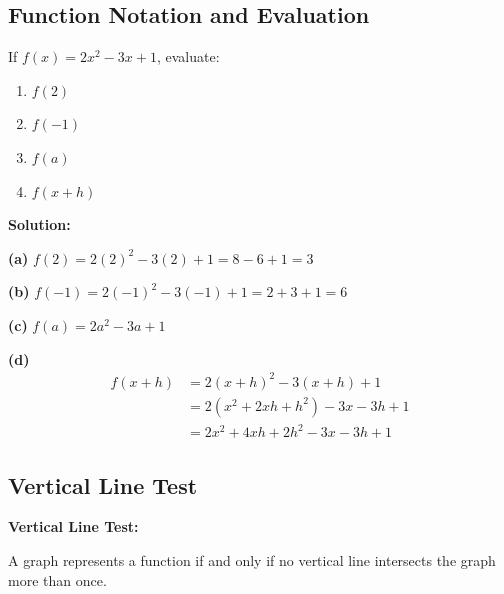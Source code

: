 \documentclass[12pt,a4paper]{article}
\begin{document}
\subsection{Function Notation and Evaluation}

\begin{example}
If $f(x) = 2x^2 - 3x + 1$, evaluate:
\begin{enumerate}[label=(\alph*)]
    \item $f(2)$
    \item $f(-1)$
    \item $f(a)$
    \item $f(x+h)$
\end{enumerate}

\textbf{Solution:}

\textbf{(a)} $f(2) = 2(2)^2 - 3(2) + 1 = 8 - 6 + 1 = 3$

\textbf{(b)} $f(-1) = 2(-1)^2 - 3(-1) + 1 = 2 + 3 + 1 = 6$

\textbf{(c)} $f(a) = 2a^2 - 3a + 1$

\textbf{(d)} 
\begin{align*}
f(x+h) &= 2(x+h)^2 - 3(x+h) + 1 \\
&= 2(x^2 + 2xh + h^2) - 3x - 3h + 1 \\
&= 2x^2 + 4xh + 2h^2 - 3x - 3h + 1
\end{align*}
\end{example}

\subsection{Vertical Line Test}

\begin{theorem}
\textbf{Vertical Line Test:}

A graph represents a function if and only if no vertical line intersects the graph more than once.
\end{theorem}
\end{document}
